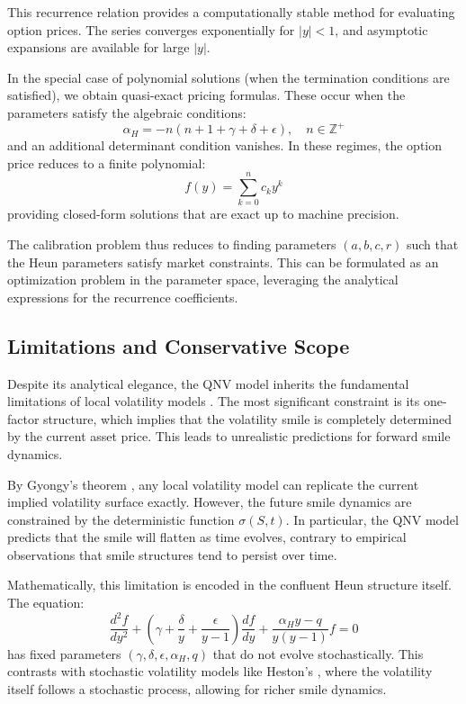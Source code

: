 \documentclass[a4paper,11pt]{article}
\begin{document}
This recurrence relation provides a computationally stable method for evaluating option prices. The series converges exponentially for $|y| < 1$, and asymptotic expansions are available for large $|y|$.

In the special case of polynomial solutions (when the termination conditions are satisfied), we obtain quasi-exact pricing formulas. These occur when the parameters satisfy the algebraic conditions:
\begin{equation}
\alpha_H = -n(n + 1 + \gamma + \delta + \epsilon), \quad n \in \mathbb{Z}^+
\end{equation}
and an additional determinant condition vanishes. In these regimes, the option price reduces to a finite polynomial:
\begin{equation}
f(y) = \sum_{k=0}^n c_k y^k
\end{equation}
providing closed-form solutions that are exact up to machine precision.

The calibration problem thus reduces to finding parameters $(a, b, c, r)$ such that the Heun parameters satisfy market constraints. This can be formulated as an optimization problem in the parameter space, leveraging the analytical expressions for the recurrence coefficients.

\subsection{Limitations and Conservative Scope}

Despite its analytical elegance, the QNV model inherits the fundamental limitations of local volatility models \cite{Heston1993,Gyongy1986}. The most significant constraint is its one-factor structure, which implies that the volatility smile is completely determined by the current asset price. This leads to unrealistic predictions for forward smile dynamics.

By Gyongy's theorem \cite{Gyongy1986}, any local volatility model can replicate the current implied volatility surface exactly. However, the future smile dynamics are constrained by the deterministic function $\sigma(S,t)$. In particular, the QNV model predicts that the smile will flatten as time evolves, contrary to empirical observations that smile structures tend to persist over time.

Mathematically, this limitation is encoded in the confluent Heun structure itself. The equation:
\begin{equation}
\frac{d^2f}{dy^2} + \left(\gamma + \frac{\delta}{y} + \frac{\epsilon}{y-1}\right)\frac{df}{dy} + \frac{\alpha_H y - q}{y(y-1)}f = 0
\end{equation}
has fixed parameters $(\gamma, \delta, \epsilon, \alpha_H, q)$ that do not evolve stochastically. This contrasts with stochastic volatility models like Heston's \cite{Heston1993}, where the volatility itself follows a stochastic process, allowing for richer smile dynamics.
\end{document}
